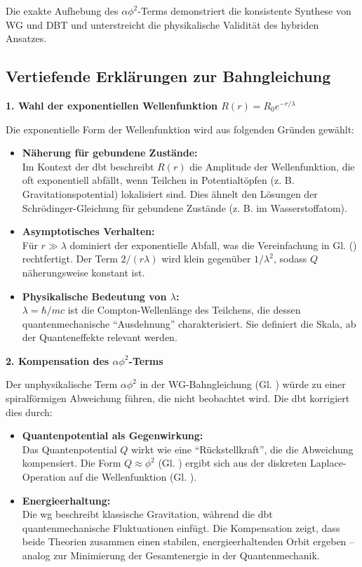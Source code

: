 Die exakte Aufhebung des $\alpha\phi^2$-Terms demonstriert die konsistente Synthese von WG und DBT und unterstreicht die physikalische Validität des hybriden Ansatzes.

\subsection{Vertiefende Erklärungen zur Bahngleichung}
\textbf{1. Wahl der exponentiellen Wellenfunktion $R(r)=R_0 e^{-r/\lambda}$}

Die exponentielle Form der Wellenfunktion wird aus folgenden Gründen gewählt:
\begin{itemize}
    \item \textbf{Näherung für gebundene Zustände:}\\Im Kontext der \gls{dbt} beschreibt $R(r)$ die Amplitude der Wellenfunktion, die oft exponentiell abfällt, wenn Teilchen in Potentialtöpfen (z. B. Gravitationspotential) lokalisiert sind. Dies ähnelt den Lösungen der Schrödinger-Gleichung für gebundene Zustände (z. B. im Wasserstoffatom).
    \item \textbf{Asymptotisches Verhalten:}\\Für $r \gg \lambda$ dominiert der exponentielle Abfall, was die Vereinfachung in Gl. () rechtfertigt. Der Term $2/(r \lambda)$ wird klein gegenüber $1/\lambda^{2}$, sodass $Q$ näherungsweise konstant ist.
    \item \textbf{Physikalische Bedeutung von $\lambda$:}\\$\lambda=\hbar/mc$ ist die Compton-Wellenlänge des Teilchens, die dessen quantenmechanische \enquote{Ausdehnung} charakterisiert. Sie definiert die Skala, ab der Quanteneffekte relevant werden.
\end{itemize}

\textbf{2. Kompensation des $\alpha \phi^{2}$-Terms}

Der unphysikalische Term $\alpha \phi^{2}$ in der WG-Bahngleichung (Gl. ) würde zu einer spiralförmigen Abweichung führen, die nicht beobachtet wird.
Die \gls{dbt} korrigiert dies durch:
\begin{itemize}
    \item \textbf{Quantenpotential als Gegenwirkung:}\\Das Quantenpotential $Q$ wirkt wie eine \enquote{Rückstellkraft}, die die Abweichung kompensiert. Die Form $Q \approx \phi^{2}$ (Gl. ) ergibt sich aus der diskreten Laplace-Operation auf die Wellenfunktion (Gl. ).
    \item \textbf{Energieerhaltung:}\\Die \gls{wg} beschreibt klassische Gravitation, während die \gls{dbt} quantenmechanische Fluktuationen einfügt. Die Kompensation zeigt, dass beide Theorien zusammen einen stabilen, energieerhaltenden Orbit ergeben – analog zur Minimierung der Gesamtenergie in der Quantenmechanik.
\end{itemize}

